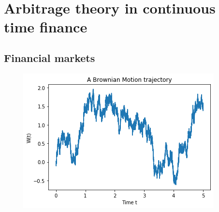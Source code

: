 
\chapter{Arbitrage theory in continuous time finance} %

\label{Chapter2} %


\section{Financial markets}

\begin{figure}[th]
\centering
\includegraphics{Figures/brownianMotion.png}
\decoRule
\caption[A Wiener process trajectory]{}
\label{fig:BM}
\end{figure}


